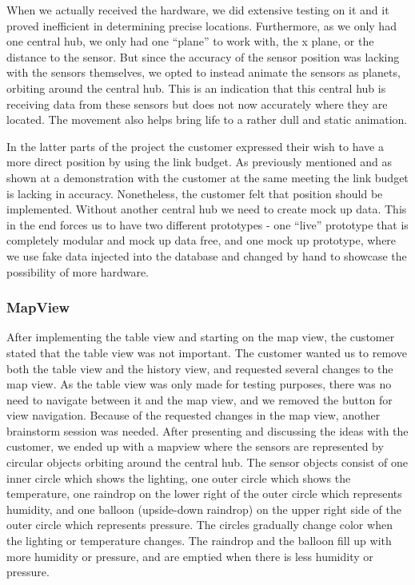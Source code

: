 \documentclass[../document.tex]{subfiles}
\begin{document}
When we actually received the hardware, we did extensive testing on it and it proved inefficient in determining precise locations. Furthermore, as we only had one central hub, we only had one “plane” to work with, the x plane, or the distance to the sensor. But since the accuracy of the sensor position was lacking with the sensors themselves, we opted to instead animate the sensors as planets, orbiting around the central hub. This is an indication that this central hub is receiving data from these sensors but does not now accurately where they are located. The movement also helps bring life to a rather dull and static animation.

In the latter parts of the project the customer expressed their wish to have a more direct position by using the link budget. As previously mentioned and as shown at a demonstration with the customer at the same meeting the link budget is lacking in accuracy. Nonetheless, the customer felt that position should be implemented. Without another central hub we need to create mock up data. This in the end forces us to have two different prototypes - one “live” prototype that is completely modular and mock up data free, and one mock up prototype, where we use fake data injected into the database and changed by hand to showcase the possibility of more hardware. 

\subsubsection{MapView}
After implementing the table view and starting on the map view, the customer stated that the table view was not important. The customer wanted us to remove both the table view and the history view, and requested several changes to the map view. As the table view was only made for testing purposes, there was no need to navigate between it and the map view, and we removed the button for view navigation. Because of the requested changes in the map view, another brainstorm session was needed. After presenting and discussing the ideas with the customer, we ended up with a mapview where the sensors are represented by circular objects orbiting around the central hub. The sensor objects consist of one inner circle which shows the lighting, one outer circle which shows the temperature, one raindrop on the lower right of the outer circle which represents humidity, and one balloon (upside-down raindrop) on the upper right side of the outer circle which represents pressure. The circles gradually change color when the lighting or temperature changes. The raindrop and the balloon fill up with more humidity or pressure, and are emptied when there is less humidity or pressure.
\end{document}
